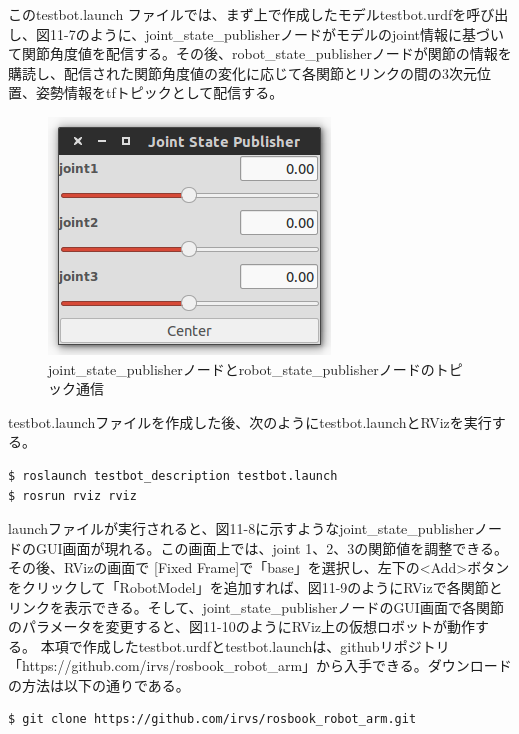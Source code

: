 このtestbot.launch ファイルでは、まず上で作成したモデルtestbot.urdfを呼び出し、図11-7のように、joint\_state\_publisherノードがモデルのjoint情報に基づいて関節角度値を配信する。その後、robot\_state\_publisherノードが関節の情報を購読し、配信された関節角度値の変化に応じて各関節とリンクの間の3次元位置、姿勢情報をtfトピックとして配信する。

\begin{figure}[ht]
  \centering
  \includegraphics[width=0.5\columnwidth]{pictures/chapter11/pic_11_07.png}
  \caption{joint\_state\_publisherノードとrobot\_state\_publisherノードのトピック通信}
\end{figure}

testbot.launchファイルを作成した後、次のようにtestbot.launchとRVizを実行する。

\begin{lstlisting}[language=ROS]
$ roslaunch testbot_description testbot.launch
$ rosrun rviz rviz
\end{lstlisting}

launchファイルが実行されると、図11-8に示すようなjoint\_state\_publisherノードのGUI画面が現れる。この画面上では、joint 1、2、3の関節値を調整できる。その後、RVizの画面で [Fixed Frame]で「base」を選択し、左下の<Add>ボタンをクリックして「RobotModel」を追加すれば、図11-9のようにRVizで各関節とリンクを表示できる。そして、joint\_state\_publisherノードのGUI画面で各関節のパラメータを変更すると、図11-10のようにRViz上の仮想ロボットが動作する。
本項で作成したtestbot.urdfとtestbot.launchは、githubリポジトリ「https://github.com/irvs/rosbook\_robot\_arm」から入手できる。ダウンロードの方法は以下の通りである。

\begin{lstlisting}[language=ROS]
$ git clone https://github.com/irvs/rosbook_robot_arm.git
\end{lstlisting}

